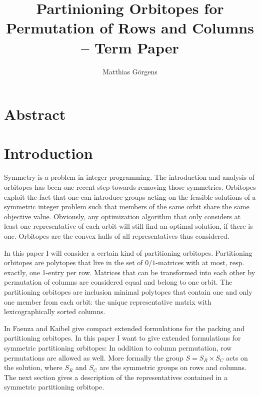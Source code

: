 \documentclass{article}
\author{Matthias Görgens}
\begin{document}
\title{Partinioning Orbitopes for Permutation of Rows and Columns -- Term Paper}
\maketitle
\section{Abstract}

\section{Introduction}
Symmetry is a problem in integer programming.  The introduction and
analysis of orbitopes has been one recent step towards removing those
symmetries.  Orbitopes exploit the fact that one can introduce groups
acting on the feasible solutions of a symmetric integer problem such
that members of the same orbit share the same objective value.
Obviously, any optimization algorithm that only considers at least one
representative of each orbit will still find an optimal solution, if
there is one.  Orbitopes are the convex hulls of all representatives
thus considered.

In this paper I will consider a certain kind of partitioning
orbitopes.  Partitioning orbitopes are polytopes that live in the
set of $0/1$-matrices with at most, resp. exactly, one 1-entry per
row.  Matrices that can be transformed into each other by permutation
of columns are considered equal and belong to one orbit.  The
partitioning orbitopes are inclusion minimal polytopes that contain
one and only one member from each orbit: the unique representative
matrix with lexicographically sorted columns.

In \cite{faenza-2008} Faenza and Kaibel give compact extended
formulations for the packing and partitioning orbitopes.  In this
paper I want to give extended formulations for symmetric partitioning
orbitopes: In addition to column permutation, row permutations are
allowed as well.  More formally the group \(S = S_R \times S_C\) acts
on the solution, where \(S_R\) and \(S_C\) are the symmetric groups on
rows and columns.  The next section gives a description of the
representatives contained in a symmetric partitioning orbitope.

\end{document}
